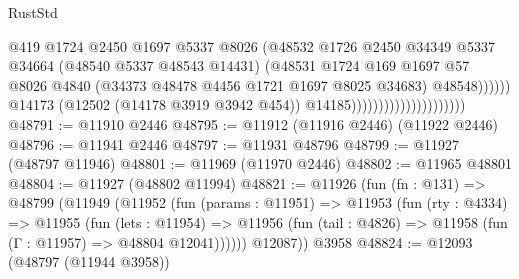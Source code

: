 \begin{lexlean}{RustStd}
\begin{coremodule}
                                                      @419
                                                      @1724
                                                      @2450
                                                      @1697
                                                      @5337
                                                      @8026
                                                      (@48532
                                                        @1726
                                                        @2450
                                                        @34349
                                                        @5337
                                                        @34664
                                                        (@48540 @5337 @48543 @14431)
                                                        (@48531
                                                          @1724
                                                          @169
                                                          @1697
                                                          @57
                                                          @8026
                                                          @4840
                                                          (@34373
                                                            @48478
                                                            @4456
                                                            @1721
                                                            @1697
                                                            @8025
                                                            @34683)
                                                          @48548))))))
                                              @14173
                                              (@12502 (@14178 @3919 @3942 @454))
                                              @14185)))))))))))))))))))))
@48791 := @11910 @2446
@48795 := @11912 (@11916 @2446) (@11922 @2446)
@48796 := @11941 @2446
@48797 := @11931 @48796
@48799 := @11927 (@48797 @11946)
@48801 := @11969 (@11970 @2446)
@48802 := @11965 @48801
@48804 := @11927 (@48802 @11994)
@48821 := @11926
    (fun (fn : @131) =>
    @48799
      (@11949
        (@11952
          (fun (params : @11951) =>
          @11953
            (fun (rty : @4334) =>
            @11955
              (fun (lets : @11954) =>
              @11956 (fun (tail : @4826) => @11958 (fun (Γ : @11957) => @48804 @12041))))))
        @12087))
    @3958
@48824 := @12093 (@48797 (@11944 @3958))

\end{coremodule}
\end{lexlean}
